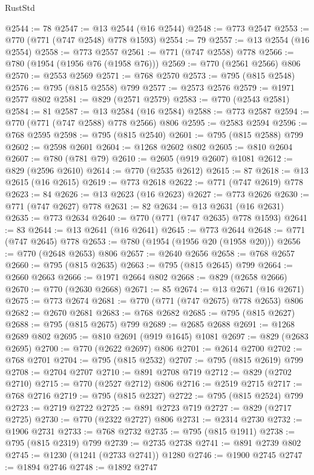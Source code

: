\begin{lexlean}{RustStd}
\begin{coremodule}
{\begin{coremodule}
{{{{{{{{{{{{{{{@2544 := 78
@2547 := @13 @2544 (@16 @2544)
@2548 := @773 @2547
@2553 := @770 (@771 (@747 @2548) @778 @1593)
@2554 := 79
@2557 := @13 @2554 (@16 @2554)
@2558 := @773 @2557
@2561 := @771 (@747 @2558) @778
@2566 := @780 (@1954 (@1956 @76 (@1958 @76)))
@2569 := @770 (@2561 @2566) @806
@2570 := @2553 @2569
@2571 := @768 @2570
@2573 := @795 (@815 @2548)
@2576 := @795 (@815 @2558) @799
@2577 := @2573 @2576
@2579 := @1971 @2577 @802
@2581 := @829 (@2571 @2579)
@2583 := @770 (@2543 @2581)
@2584 := 81
@2587 := @13 @2584 (@16 @2584)
@2588 := @773 @2587
@2594 := @770 (@771 (@747 @2588) @778 @2566) @806
@2595 := @2583 @2594
@2596 := @768 @2595
@2598 := @795 (@815 @2540)
@2601 := @795 (@815 @2588) @799
@2602 := @2598 @2601
@2604 := @1268 @2602 @802
@2605 := @810 @2604
@2607 := @780 (@781 @79)
@2610 := @2605 (@919 @2607) @1081
@2612 := @829 (@2596 @2610)
@2614 := @770 (@2535 @2612)
@2615 := 87
@2618 := @13 @2615 (@16 @2615)
@2619 := @773 @2618
@2622 := @771 (@747 @2619) @778
@2623 := 84
@2626 := @13 @2623 (@16 @2623)
@2627 := @773 @2626
@2630 := @771 (@747 @2627) @778
@2631 := 82
@2634 := @13 @2631 (@16 @2631)
@2635 := @773 @2634
@2640 := @770 (@771 (@747 @2635) @778 @1593)
@2641 := 83
@2644 := @13 @2641 (@16 @2641)
@2645 := @773 @2644
@2648 := @771 (@747 @2645) @778
@2653 := @780 (@1954 (@1956 @20 (@1958 @20)))
@2656 := @770 (@2648 @2653) @806
@2657 := @2640 @2656
@2658 := @768 @2657
@2660 := @795 (@815 @2635)
@2663 := @795 (@815 @2645) @799
@2664 := @2660 @2663
@2666 := @1971 @2664 @802
@2668 := @829 (@2658 @2666)
@2670 := @770 (@2630 @2668)
@2671 := 85
@2674 := @13 @2671 (@16 @2671)
@2675 := @773 @2674
@2681 := @770 (@771 (@747 @2675) @778 @2653) @806
@2682 := @2670 @2681
@2683 := @768 @2682
@2685 := @795 (@815 @2627)
@2688 := @795 (@815 @2675) @799
@2689 := @2685 @2688
@2691 := @1268 @2689 @802
@2695 := @810 @2691 (@919 @1645) @1081
@2697 := @829 (@2683 @2695)
@2700 := @770 (@2622 @2697) @806
@2701 := @2614 @2700
@2702 := @768 @2701
@2704 := @795 (@815 @2532)
@2707 := @795 (@815 @2619) @799
@2708 := @2704 @2707
@2710 := @891 @2708 @719
@2712 := @829 (@2702 @2710)
@2715 := @770 (@2527 @2712) @806
@2716 := @2519 @2715
@2717 := @768 @2716
@2719 := @795 (@815 @2327)
@2722 := @795 (@815 @2524) @799
@2723 := @2719 @2722
@2725 := @891 @2723 @719
@2727 := @829 (@2717 @2725)
@2730 := @770 (@2322 @2727) @806
@2731 := @2314 @2730
@2732 := @1906 @2731
@2733 := @768 @2732
@2735 := @795 (@815 @1911)
@2738 := @795 (@815 @2319) @799
@2739 := @2735 @2738
@2741 := @891 @2739 @802
@2745 := @1230 (@1241 (@2733 @2741)) @1280
@2746 := @1900 @2745
@2747 := @1894 @2746
@2748 := @1892 @2747
}}}}}}}}}}}}}}}
\end{coremodule}}
\end{coremodule}
\end{lexlean}

